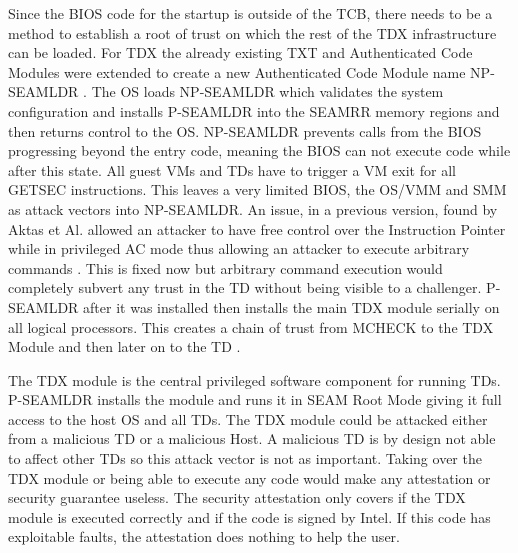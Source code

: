 
Since the BIOS code for the startup is outside of the \gls{TCB}, there needs to be a method to establish a root of trust on which the rest of the TDX infrastructure can be loaded. For TDX the already existing TXT and Authenticated Code Modules were extended to create a new Authenticated Code Module name NP-SEAMLDR \cite{intel_corporation_intel_TXT_nodate}. The OS loads NP-SEAMLDR which validates the system configuration and installs P-SEAMLDR into the \Gls{SEAMRR} memory regions and then returns control to the OS. NP-SEAMLDR prevents calls from the BIOS progressing beyond the entry code, meaning the BIOS can not execute code while after this state. All guest VMs and TDs have to trigger a VM exit for all \Gls{GETSEC} instructions. This leaves a very limited BIOS, the OS/VMM and SMM as attack vectors into NP-SEAMLDR. An issue, in a previous version, found by Aktas et Al. allowed an attacker to have free control over the Instruction Pointer while in privileged AC mode thus allowing an attacker to execute arbitrary commands \cite{aktas_intel_nodate}. This is fixed now but arbitrary command execution would completely subvert any trust in the \Gls{TD} without being visible to a challenger. P-SEAMLDR after it was installed then installs the main TDX module serially on all logical processors. This creates a chain of trust from MCHECK to the TDX Module and then later on to the TD \cite{intel_corporation_intel_seam_2023}. 


The TDX module is the central privileged software component for running TDs. P-SEAMLDR installs the module and runs it in SEAM Root Mode giving it full access to the host OS and all TDs. The TDX module could be attacked either from a malicious TD or a malicious Host. A malicious TD is by design not able to affect other TDs so this attack vector is not as important. Taking over the TDX module or being able to execute any code would make any attestation or security guarantee useless. The security attestation only covers if the TDX module is executed correctly and if the code is signed by Intel. If this code has exploitable faults, the attestation does nothing to help the user.


